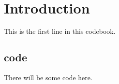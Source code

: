 \documentclass[a4paper, 12pt]{article}
\begin{document}
\maketitle
\tableofcontents

\section{Introduction}
This is the first line in this codebook.
\subsection{code}
There will be some code here.
\end{document}
